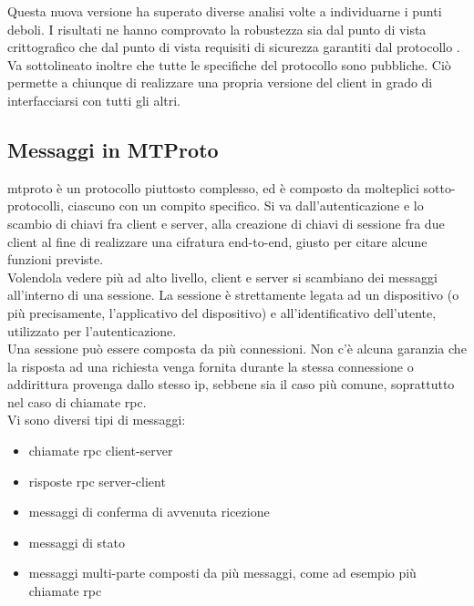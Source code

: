 Questa nuova versione ha superato diverse analisi volte a individuarne i punti deboli.
I risultati ne hanno comprovato la robustezza sia dal punto di vista crittografico \cite{inp:mtproto-attacks}
che dal punto di vista requisiti di sicurezza garantiti dal protocollo \cite{inp:mtproto-proverif}. \\

Va sottolineato inoltre che tutte le specifiche del protocollo sono pubbliche.
Ciò permette a chiunque di realizzare una propria versione del client in grado di interfacciarsi con tutti gli altri. \\

\subsection{Messaggi in MTProto}

\gls{mtproto} è un protocollo piuttosto complesso, ed è composto da molteplici sotto-protocolli, ciascuno con un compito specifico.
Si va dall'autenticazione e lo scambio di chiavi fra client e server, alla creazione di chiavi di sessione fra due client
al fine di realizzare una cifratura end-to-end, giusto per citare alcune funzioni previste. \\
Volendola vedere più ad alto livello, client e server si scambiano dei messaggi all'interno di una sessione.
La sessione è strettamente legata ad un dispositivo (o più precisamente, l'applicativo del dispositivo)
e all'identificativo dell'utente, utilizzato per l'autenticazione. \\
Una sessione può essere composta da più connessioni.
Non c'è alcuna garanzia che la risposta ad una richiesta venga fornita durante la stessa connessione o addirittura provenga dallo stesso \gls{ip},
sebbene sia il caso più comune, soprattutto nel caso di chiamate \gls{rpc}. \\

Vi sono diversi tipi di messaggi:
\begin{itemize}
    \item chiamate \gls{rpc} client-server
    \item risposte \gls{rpc} server-client
    \item messaggi di conferma di avvenuta ricezione
    \item messaggi di stato
    \item messaggi multi-parte composti da più messaggi, come ad esempio più chiamate \gls{rpc}
\end{itemize}


